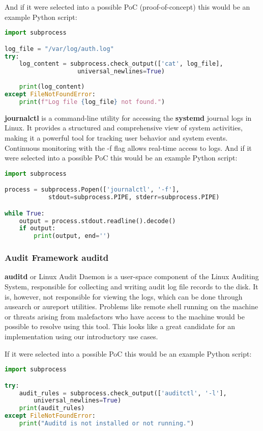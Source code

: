 \documentclass{VUMIFPSmagistrinis}
\begin{document}
\noindent And if it were selected into a possible PoC (proof-of-concept) this would be an example Python script:
\begin{lstlisting}[language=Python]
import subprocess

log_file = "/var/log/auth.log"
try:
    log_content = subprocess.check_output(['cat', log_file], 
                    universal_newlines=True)
    
    print(log_content)
except FileNotFoundError:
    print(f"Log file {log_file} not found.")
\end{lstlisting}

\textbf{journalctl} is a command-line utility for accessing the \textbf{systemd} journal logs in Linux. It provides a structured and comprehensive view of system activities, making it a powerful tool for tracking user behavior and system events. Continuous monitoring with the -f flag allows real-time access to logs. And if it were selected into a possible PoC this would be an example Python script:
\begin{lstlisting}[language=Python]
import subprocess

process = subprocess.Popen(['journalctl', '-f'], 
            stdout=subprocess.PIPE, stderr=subprocess.PIPE)

while True:
    output = process.stdout.readline().decode()
    if output:
        print(output, end='')
\end{lstlisting}

\subsubsection{Audit Framework auditd}
\textbf{auditd} or Linux Audit Daemon is a user-space component of the Linux Auditing System, responsible for collecting and writing audit log file records to the disk. It is, however, not responsible for viewing the logs, which can be done through ausearch or aureport utilities. Problems like remote shell running on the machine or threats arising from malefactors who have access to the machine would be possible to resolve using this tool. This looks like a great candidate for an implementation using our introductory use cases.

If it were selected into a possible PoC this would be an example Python script:
\begin{lstlisting}[language=Python]
import subprocess

try:
    audit_rules = subprocess.check_output(['auditctl', '-l'], 
        universal_newlines=True)
    print(audit_rules)
except FileNotFoundError:
    print("Auditd is not installed or not running.")
\end{lstlisting}
\end{document}
